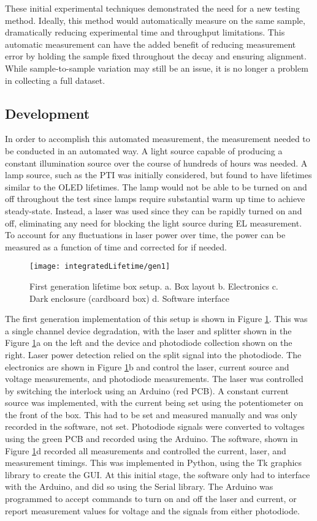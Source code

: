 \documentclass[../thesis.tex]{subfiles}
\begin{document}
These initial experimental techniques demonstrated the need for a new testing method.
Ideally, this method would automatically measure \pl on the same sample, dramatically reducing experimental time and throughput limitations.
This automatic measurement can have the added benefit of reducing measurement error by holding the sample fixed throughout the decay and ensuring alignment.
While sample-to-sample variation may still be an issue, it is no longer a problem in collecting a full dataset.

\subsection{Development}

In order to accomplish this automated measurement, the \pl measurement needed to be conducted in an automated way.
A light source capable of producing a constant illumination source over the course of hundreds of hours was needed.
A lamp source, such as the PTI was initially considered, but found to have lifetimes similar to the OLED lifetimes.
The lamp would not be able to be turned on and off throughout the test since lamps require substantial warm up time to achieve steady-state.
Instead, a laser was used since they can be rapidly turned on and off, eliminating any need for blocking the light source during EL measurement.
To account for any fluctuations in laser power over time, the power can be measured as a function of time and corrected for if needed.

\begin{figure}[ht]
\centering
\texttt{[image: integratedLifetime/gen1]}
\caption{First generation lifetime box setup.  a.  Box layout  b. Electronics c. Dark enclosure (cardboard box) d. Software interface}
\label{fig:gen1}
\end{figure}

The first generation implementation of this setup is shown in Figure \ref{fig:gen1}.
This was a single channel device degradation, with the laser and splitter shown in the Figure \ref{fig:gen1}a on the left and the device and photodiode collection shown on the right.
Laser power detection relied on the split signal into the photodiode.
The electronics are shown in Figure \ref{fig:gen1}b and control the laser, current source and voltage measurements, and photodiode measurements.
The laser was controlled by switching the interlock using an Arduino (red PCB).
A constant current source was implemented, with the current being set using the potentiometer on the front of the box.  
This had to be set and measured manually and was only recorded in the software, not set.
Photodiode signals were converted to voltages using the green PCB and recorded using the Arduino. 
The software, shown in Figure \ref{fig:gen1}d recorded all measurements and controlled the current, laser, and measurement timings.
This was implemented in Python, using the Tk graphics library to create the GUI.  
At this initial stage, the software only had to interface with the Arduino, and did so using the Serial library.
The Arduino was programmed to accept commands to turn on and off the laser and current, or report measurement values for voltage and the signals from either photodiode.
\end{document}
